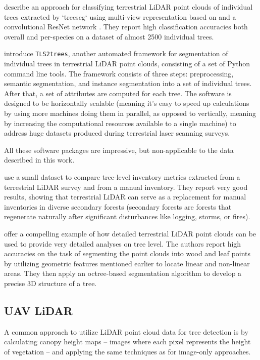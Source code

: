 \citet{allenTreeSpeciesClassification2022} describe an approach for classifying terrestrial LiDAR point clouds of individual trees extracted by `treeseg` using multi-view representation based on \citet{goyalRevisitingPointCloud2021} and a convolutional ResNet network \citep{heDeepResidualLearning2016}.
They report high classification accuracies both overall and per-species on a dataset of almost 2500 individual trees.

\citet{wilkesTLS2treesScalableTree2023} introduce \texttt{TLS2trees}, another automated framework for segmentation of individual trees in terrestrial LiDAR point clouds, consisting of a set of Python command line tools.
The framework consists of three steps: preprocessing, semantic segmentation, and instance segmentation into a set of individual trees.
After that, a set of attributes are computed for each tree.
The software is designed to be horizontally scalable (meaning it's easy to speed up calculations by using more machines doing them in parallel, as opposed to vertically, meaning by increasing the computational resources available to a single machine) to address huge datasets produced during terrestrial laser scanning surveys.

All these software packages are impressive, but non-applicable to the data described in this work.

\citet{vianaTimberVolumeEstimation2022} use a small dataset to compare tree-level inventory metrics extracted from a terrestrial LiDAR survey and from a manual inventory.
They report very good results, showing that terrestrial LiDAR can serve as a replacement for manual inventories in diverse secondary forests (secondary forests are forests that regenerate naturally after significant disturbances like logging, storms, or fires).

\citet{nurunnabiDevelopmentPreciseTree2024} offer a compelling example of how detailed terrestrial LiDAR point clouds can be used to provide very detailed analyses on tree level.
The authors report high accuracies on the task of segmenting the point clouds into wood and leaf points by utilizing geometric features mentioned earlier to locate linear and non-linear areas.
They then apply an octree-based segmentation algorithm to develop a precise 3D structure of a tree.

\subsection{UAV LiDAR}

A common approach to utilize LiDAR point cloud data for tree detection is by calculating canopy height maps – images where each pixel represents the height of vegetation – and applying the same techniques as for image-only approaches.

